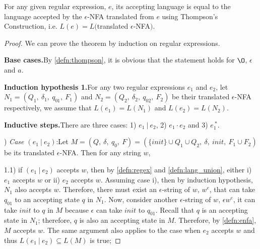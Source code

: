 \begin{thm} 
\noindent For any given regular expression, \(e\), its accepting
language is equal to the language accepted by the \(\epsilon\)-NFA
translated from \(e\) using Thompson's Construction, i.e. \(L(e) =
L(\)translated \(\epsilon\)-NFA\()\). 
\end{thm} 

\begin{proof}
\noindent We can prove the theorem by induction on regular
expressions. 

\par \noindent \textbf{Base cases.}\quad By \autoref{defn:thompson}, it is
obvious that the statement holds for \(\O\), \(\epsilon\) and
\(a\). 

\par \noindent \textbf{Induction hypothesis 1.}\quad For any two regular expressions
\(e_1\) and \(e_2\), let \(N_1 =
(Q_1,\ \delta_1,\ q_{01},\ F_1)\) and \(N_2 = (Q_2,\ \delta_2,\
q_{02},\ F_2)\) be their translated \(\epsilon\)-NFA 
respectively, we assume that \(L(e_1) = L(N_1)\) and \(L(e_2) =
L(N_2)\). 

\par \noindent \textbf{Inductive steps.}\quad There are three cases: 1)
\(e_1\ |\ e_2\), 2) \(e_1 \cdot e_2\) and 3) \(e_1^{\ *}\). 

\par {}) \textit{Case \((e_1\ |\ e_2)\)}:\quad Let \(M = (Q,\ \delta,\ q_0,\ F) = (\{init\} \cup Q_1 \cup Q_2,\
\delta,\ init,\ F_1 \cup F_2)\) be its translated \(\epsilon\)-NFA. Then for any string \(w\), 

\par 1.1) if \((e_1\ |\ e_2)\) accepts \(w\), then by
\autoref{defn:regex} and \autoref{defn:lang_union},
either i) \(e_1\) accepts \(w\) or ii) \(e_2\) accepts \(w\). Assuming case i), then by
induction hypothesis, \(N_1\) also accepts \(w\). Therefore, there
must exist an \(\epsilon\)-string of \(w\), \(w^e\), that can take \(q_{01}\)
to an accepting state \(q\) in \(N_1\). Now, consider another
\(\epsilon\)-string of \(w\), \(\epsilon w^e\), it can
take \(init\) to \(q\) in \(M\) because \(\epsilon\) can take \(init\)
to \(q_{01}\). Recall that \(q\) is an accepting
state in \(N_1\); therefore, \(q\) is also an accepting state in
\(M\). Therefore, by \autoref{defn:enfa}, \(M\) accepts \(w\). The same argument also applies
to the case when \(e_2\) accepts \(w\) and thus \(L(e_1\ |\ e_2) \subseteq L(M)\) is true; 


\end{proof}
